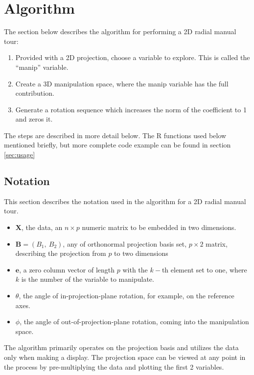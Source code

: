 \documentclass{monashthesis}
\begin{document}
\hypertarget{sec:algorithm}{%
\section{Algorithm}\label{sec:algorithm}}

The section below describes the algorithm for performing a 2D radial manual tour:

\begin{enumerate}
\def\labelenumi{\arabic{enumi}.}
\tightlist
\item
  Provided with a 2D projection, choose a variable to explore. This is called the ``manip'' variable.
\item
  Create a 3D manipulation space, where the manip variable has the full contribution.
\item
  Generate a rotation sequence which increases the norm of the coefficient to 1 and zeros it.
\end{enumerate}

The steps are described in more detail below. The R functions used below mentioned briefly, but more complete code example can be found in section \ref{sec:usage}

\hypertarget{notation}{%
\subsection{Notation}\label{notation}}

This section describes the notation used in the algorithm for a 2D radial manual tour.

\begin{itemize}
  \item $\textbf{X}$, the data, an $n \times p$ numeric matrix to be embedded in two dimensions.
  \item $\textbf{B} = (B_1,~ B_2)$, any of orthonormal projection basis set, $p \times 2$ matrix, describing the projection from $p$ to two dimensions
  \item $\textbf{e}$, a zero column vector of length $p$ with the $k-$th element set to one, where $k$ is the number of the variable to manipulate.
  \item $\theta$, the angle of in-projection-plane rotation, for example, on the reference axes. 
  \item $\phi$, the angle of out-of-projection-plane rotation, coming into the manipulation space.
\end{itemize}

The algorithm primarily operates on the projection basis and utilizes the data only when making a display. The projection space can be viewed at any point in the process by pre-multiplying the data and plotting the first 2 variables.
\end{document}
